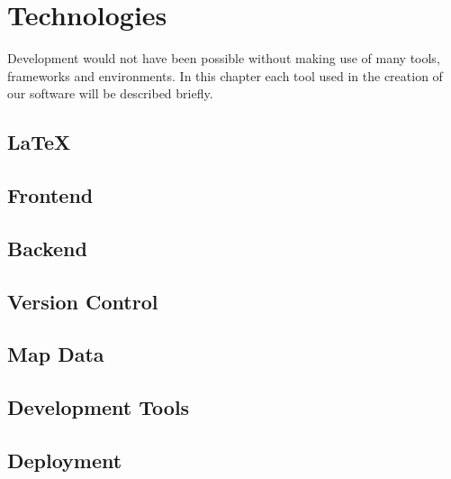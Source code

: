 \section{Technologies}

Development would not have been possible without making use of many tools, frameworks and environments. In this chapter each tool used in the creation of our software will be described briefly.

\subsection{LaTeX}


%

\subsection{Frontend}


\subsection{Backend}


\subsection{Version Control}


\subsection{Map Data}


\subsection{Development Tools}


\subsection{Deployment}
